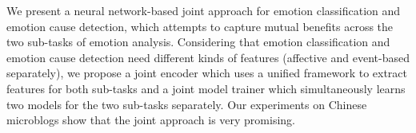 We present a neural network-based joint approach for emotion classification and emotion cause detection, which attempts to capture mutual benefits across the two sub-tasks of emotion analysis. Considering that emotion classification and emotion cause detection need different kinds of features (affective and event-based separately), we propose a joint encoder which uses a unified framework to extract features for both sub-tasks and a joint model trainer which simultaneously learns two models for the two sub-tasks separately. Our experiments on Chinese microblogs show that the joint approach is very promising.

